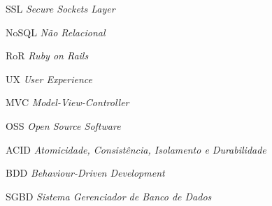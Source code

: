 \begin{siglas}
\item[SSL] \textit{Secure Sockets Layer}
\item[NoSQL] \textit{Não Relacional}
\item[RoR] \textit{Ruby on Rails}
\item[UX] \textit{User Experience}
\item[MVC] \textit{Model-View-Controller}
\item[OSS] \textit{Open Source Software}
\item[ACID] \textit{Atomicidade, Consistência, Isolamento e Durabilidade}
\item[BDD] \textit{Behaviour-Driven Development}
\item[SGBD] \textit{Sistema Gerenciador de Banco de Dados}
\end{siglas}





